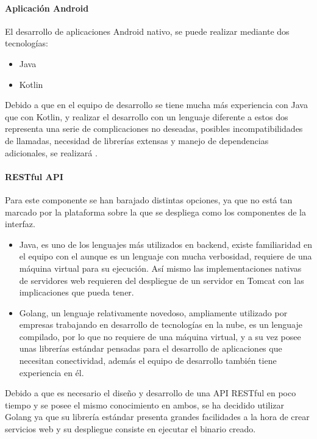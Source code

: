 \documentclass{article}
\begin{document}
\paragraph*{Aplicación Android}
El desarrollo de aplicaciones Android nativo, se puede realizar mediante dos tecnologías:

\begin{itemize}
    \item Java
    \item Kotlin
\end{itemize}

Debido a que en el equipo de desarrollo se tiene mucha más experiencia con Java que con Kotlin, y realizar 
el desarrollo con un lenguaje diferente a estos dos representa una serie de complicaciones no deseadas, 
posibles incompatibilidades de llamadas, necesidad de librerías extensas y manejo de dependencias adicionales, se realizará .

\paragraph*{RESTful API} \label{REST_API}

Para este componente se han barajado distintas opciones, ya que no está tan marcado por la plataforma sobre la que se despliega como los componentes de la interfaz.
\begin{itemize}
    \item Java, es uno de los lenguajes más utilizados en backend, existe familiaridad en el equipo con el aunque es un lenguaje con mucha verbosidad, requiere
        de una máquina virtual para su ejecución. Así mismo las implementaciones nativas de servidores web requieren del despliegue de un servidor en Tomcat con
        las implicaciones que pueda tener.
    \item Golang, un lenguaje relativamente novedoso, ampliamente utilizado por empresas trabajando en desarrollo de tecnologías en la nube, es un lenguaje 
        compilado, por lo que no requiere de una máquina virtual, y a su vez posee unas librerías estándar pensadas para el desarrollo de aplicaciones que 
        necesitan conectividad, además el equipo de desarrollo también tiene experiencia en él.
\end{itemize}

Debido a que es necesario el diseño y desarrollo de una API RESTful en poco tiempo y se posee el mismo conocimiento en ambos, se ha decidido utilizar Golang ya que su librería estándar presenta grandes facilidades a la hora de crear servicios web y su despliegue consiste en ejecutar el binario creado.
\end{document}
